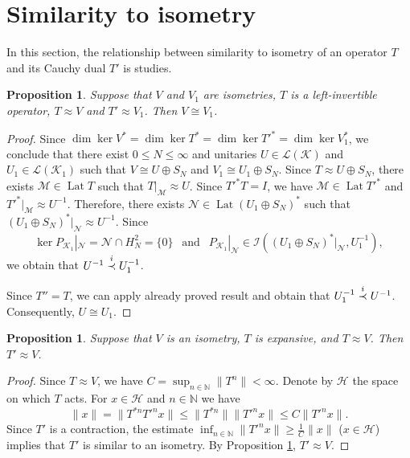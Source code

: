 \documentclass[a4paper,oneside,11pt]{amsart}
\numberwithin{equation}{section}
\theoremstyle{plain}
\newtheorem{proposition}[theorem]{Proposition}
\theoremstyle{definition}
\begin{document}
\section{Similarity to isometry} 

In this section, the relationship between similarity to isometry of an operator $T$ and its Cauchy dual $T'$ is studies. 

\begin{proposition}\label{prop1} Suppose that  $V$ and $V_1$ are isometries,  $T$ is a left-invertible operator,
 $T\approx V$ and $T'\approx V_1$. 
Then  $V\cong V_1$.
\end{proposition}

\begin{proof} Since $\dim\ker V^*=\dim\ker T^*=\dim\ker T'^*=\dim\ker V_1^*$, we conclude that there exist $0\leq N\leq\infty$ 
and unitaries $U\in\mathcal L(\mathcal K)$  and $U_1\in\mathcal L(\mathcal  K_1)$
 such that $V\cong U\oplus S_N$ and $V_1\cong U_1\oplus S_N$. 
Since $T\approx  U\oplus S_N$, there exists $\mathcal M\in \operatorname{Lat}T$ such that $T|_{\mathcal M}\approx U$.
Since $T'^*T=I$, we have $\mathcal M\in \operatorname{Lat}T'^*$ and  $T'^*|_{\mathcal M}\approx U^{-1}$.
Therefore, there exists $\mathcal N\in \operatorname{Lat}( U_1\oplus S_N)^*$ such that 
$( U_1\oplus S_N)^*|_{\mathcal N}\approx U^{-1}$. Since 
\begin{equation*} \ker P_{\mathcal K_1}|_{\mathcal N}=\mathcal N\cap H^2_N=\{0\}\ \ \text{ and } \ \ 
  P_{\mathcal K_1}|_{\mathcal N}\in\mathcal I(( U_1\oplus S_N)^*|_{\mathcal N}, U_1^{-1}), \end{equation*} 
we obtain 
that $U^{-1}\buildrel i\over\prec  U_1^{-1}$. 

Since $T''=T$, we can apply already proved result and obtain that $U_1^{-1}\buildrel i\over\prec  U^{-1}$.  
Consequently, $U\cong U_1$. 
\end{proof}

\begin{proposition} \label{prop2} Suppose that  $V$ is an isometry, $T$ is expansive, and  $T\approx V$. 
Then $T'\approx V$. 
\end{proposition}

\begin{proof} Since $T\approx V$, we have $C=\sup_{n\in\mathbb N}\|T^n\|<\infty$. Denote by $\mathcal H$
 the space on which $T$ acts.  For $x\in\mathcal H$ and $n\in\mathbb N$ we have
\begin{equation*} \|x\|=\|T^{*n}T'^nx\|\leq\|T^{*n}\|\|T'^nx\|\leq C \|T'^nx\|.
\end{equation*}
Since $T'$ is a contraction, the estimate $\inf_{n\in\mathbb N}\|T'^nx\|\geq\frac{1}{C}\|x\|$ ($x\in\mathcal H$) implies that 
$T'$ is similar to an isometry. By Proposition \ref{prop1}, $T'\approx V$.
\end{proof}
\end{document}
